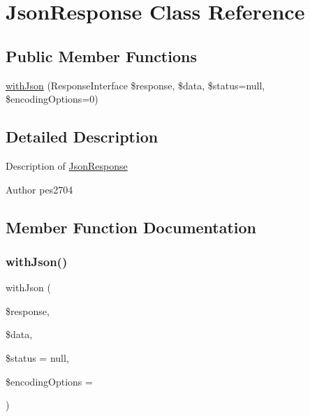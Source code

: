 \hypertarget{class_pes_1_1_http_1_1_response_1_1_json_response}{}\section{Json\+Response Class Reference}
\label{class_pes_1_1_http_1_1_response_1_1_json_response}
\subsection*{Public Member Functions}
\begin{DoxyCompactItemize}
\item 
\mbox{\hyperlink{class_pes_1_1_http_1_1_response_1_1_json_response_aac951eacb6018321ccc38b1944390308}{with\+Json}} (Response\+Interface \$response, \$data, \$status=null, \$encoding\+Options=0)
\end{DoxyCompactItemize}


\subsection{Detailed Description}
Description of \mbox{\hyperlink{class_pes_1_1_http_1_1_response_1_1_json_response}{Json\+Response}}

\begin{DoxyAuthor}{Author}
pes2704 
\end{DoxyAuthor}


\subsection{Member Function Documentation}
\mbox{\label{class_pes_1_1_http_1_1_response_1_1_json_response_aac951eacb6018321ccc38b1944390308}} 
\subsubsection{\texorpdfstring{with\+Json()}{withJson()}}
{\footnotesize\ttfamily with\+Json (\begin{DoxyParamCaption}\item[{Response\+Interface}]{\$response,  }\item[{}]{\$data,  }\item[{}]{\$status = {\ttfamily null},  }\item[{}]{\$encoding\+Options = {} }\end{DoxyParamCaption})}

